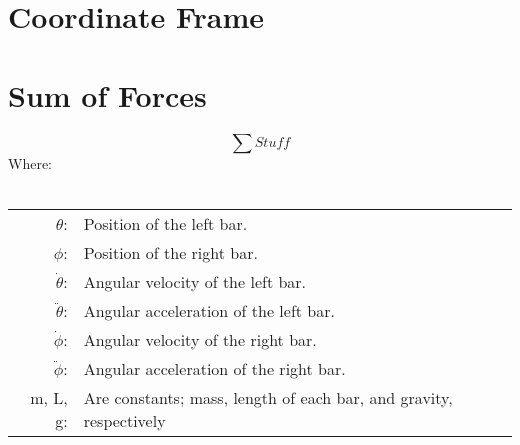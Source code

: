 \documentclass[12pt]{report}
\begin{document}
\begin{flushleft}
\section{Coordinate Frame}
\begin{center}
      
       
% 
\end{center}
\section{Sum of Forces}

\begin{equation}
  \sum Stuff
\end{equation}
Where: \\
~\\
\begin{tabular}{rl}
$\theta$:& Position of the left bar. \\
$\phi$:& Position of the right bar. \\
$\dot{\theta}$:& Angular velocity of the left bar. \\
$\ddot{\theta}$:& Angular acceleration of the left bar. \\
$\dot{\phi}$:& Angular velocity of the right bar. \\
$\ddot{\phi}$:& Angular acceleration of the right bar. \\
m, L, g: & Are constants; mass, length of each bar, and gravity, respectively
\end{tabular}

\end{flushleft}
\end{document}
